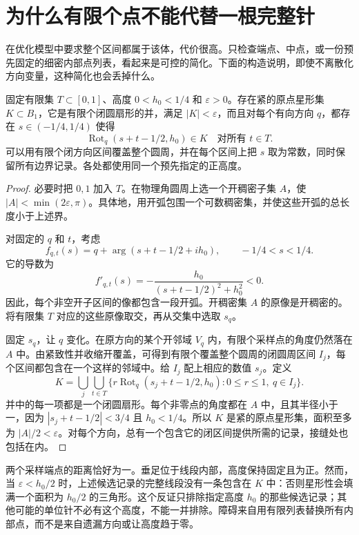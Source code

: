 
\section{为什么有限个点不能代替一根完整针}\label{sec:finite-samples}
在优化模型中要求整个区间都属于该体，代价很高。只检查端点、中点，或一份预先固定的细密内部点列表，看起来是可控的简化。下面的构造说明，即使不离散化方向变量，这种简化也会丢掉什么。

\begin{theorem}[有限采样的能力上限]\label{thm:sample-ceiling}
固定有限集 $T\subset[0,1]$、高度 $0<h_0<1/4$ 和 $\varepsilon>0$。存在紧的原点星形集 $K\subset B_1$，它是有限个闭圆扇形的并，满足 $|K|<\varepsilon$，而且对每个有向方向 $q$，都存在 $s\in(-1/4,1/4)$ 使得
\[
 \operatorname{Rot}_q(s+t-1/2,h_0)\in K\quad\text{对所有 }t\in T.
\]
可以用有限个闭方向区间覆盖整个圆周，并在每个区间上把 $s$ 取为常数，同时保留所有边界记录。各处都使用同一个预先指定的正高度。
\end{theorem}

\begin{proof}
必要时把 $0,1$ 加入 $T$。在物理角圆周上选一个开稠密子集 $A$，使 $|A|<\min(2\varepsilon,\pi)$。具体地，用开弧包围一个可数稠密集，并使这些开弧的总长度小于上述界。

对固定的 $q$ 和 $t$，考虑
\[
 f_{q,t}(s)=q+\arg(s+t-1/2+ih_0),\qquad -1/4<s<1/4.
\]
它的导数为
\[
 f'_{q,t}(s)=-\frac{h_0}{(s+t-1/2)^2+h_0^2}<0.
\]
因此，每个非空开子区间的像都包含一段开弧。开稠密集 $A$ 的原像是开稠密的。将有限集 $T$ 对应的这些原像取交，再从交集中选取 $s_q$。

固定 $s_q$，让 $q$ 变化。在原方向的某个开邻域 $V_q$ 内，有限个采样点的角度仍然落在 $A$ 中。由紧致性并收缩开覆盖，可得到有限个覆盖整个圆周的闭圆周区间 $I_j$，每个区间都包含在一个这样的邻域中。给 $I_j$ 配上相应的数值 $s_j$。定义
\[
 K=\bigcup_j\bigcup_{t\in T}
 \{r\operatorname{Rot}_q(s_j+t-1/2,h_0):0\le r\le1,\ q\in I_j\}.
\]
并中的每一项都是一个闭圆扇形。每个非零点的角度都在 $A$ 中，且其半径小于一，因为 $|s_j+t-1/2|<3/4$ 且 $h_0<1/4$。所以 $K$ 是紧的原点星形集，面积至多为 $|A|/2<\varepsilon$。对每个方向，总有一个包含它的闭区间提供所需的记录，接缝处也包括在内。
\end{proof}

两个采样端点的距离恰好为一。垂足位于线段内部，高度保持固定且为正。然而，当 $\varepsilon<h_0/2$ 时，上述候选记录的完整线段没有一条包含在 $K$ 中：否则星形性会填满一个面积为 $h_0/2$ 的三角形。这个反证只排除指定高度 $h_0$ 的那些候选记录；其他可能的单位针不必有这个高度，不能一并排除。障碍来自用有限列表替换所有内部点，而不是来自遗漏方向或让高度趋于零。

